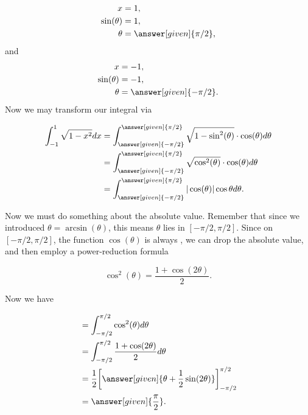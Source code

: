 \documentclass{ximera}
\begin{document}
\begin{example}
\begin{explanation}
    \begin{align*}
      x &= 1,\\
      \sin(\theta) &= 1,\\
      \theta &= \answer[given]{\pi/2},
    \end{align*}
    and
    \begin{align*}
      x &= -1,\\
      \sin(\theta) &= -1,\\
      \theta &= \answer[given]{-\pi/2}.
    \end{align*}
    Now we may transform our integral via
    \begin{image}
    \end{image}
    \begin{align*}
      \int_{-1}^1\sqrt{1-x^2} dx &= \int_{\answer[given]{-\pi/2}}^{\answer[given]{\pi/2}} \sqrt{1-\sin^2(\theta)} \cdot \cos(\theta) d\theta \\
      &= \int_{\answer[given]{-\pi/2}}^{\answer[given]{\pi/2}} \sqrt{\cos^2(\theta)}\cdot \cos(\theta) d\theta \\
      &=\int_{\answer[given]{-\pi/2}}^{\answer[given]{\pi/2}} |\cos(\theta)| \cos\theta d\theta.
    \end{align*}
    
Now we must do something about the absolute value. Remember that since we 
introduced $\theta=\arcsin(\theta)$, this means $\theta$ lies in $[- \pi/2, \pi/2 ]$. 
Since on $[-\pi/2,\pi/2]$, the function $\cos(\theta)$ is always
    ,
    we can drop the absolute value, and then employ a power-reduction
    formula

    \[
    \cos^2(\theta)= \frac{1+\cos(2\theta)}{2}.
    \]

    Now we have

    \begin{align*}
      &= \int_{-\pi/2}^{\pi/2} \cos^2(\theta) d\theta \\
      &= \int_{-\pi/2}^{\pi/2} \frac{1+\cos(2\theta)}{2} d\theta\\
      &= \frac{1}{2} \bigg[\answer[given]{\theta +\frac{1}{2}\sin(2\theta)}\bigg]_{-\pi/2}^{\pi/2}\\
      &=\answer[given]{\frac{\pi}{2}}.
    \end{align*}


\end{explanation}
\end{example}
\end{document}
